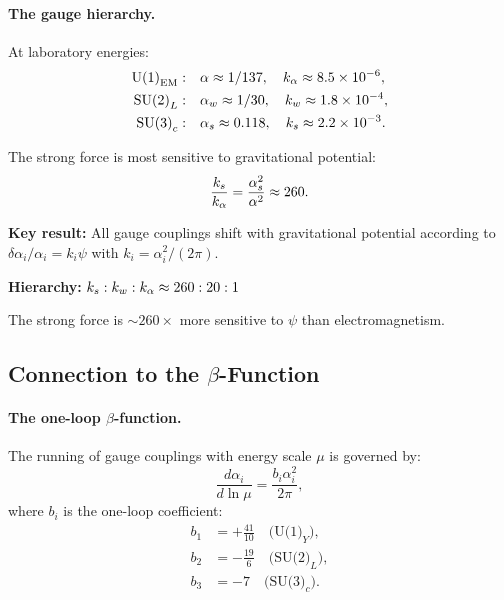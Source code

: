 \paragraph{The gauge hierarchy.}
At laboratory energies:
\begin{align}
\text{U(1)}_{\rm EM}:& \quad \alpha \approx 1/137, \quad k_\alpha \approx 8.5 \times 10^{-6}, \\
\text{SU(2)}_L:& \quad \alpha_w \approx 1/30, \quad k_w \approx 1.8 \times 10^{-4}, \\
\text{SU(3)}_c:& \quad \alpha_s \approx 0.118, \quad k_s \approx 2.2 \times 10^{-3}.
\end{align}

The strong force is most sensitive to gravitational potential:
\begin{equation}\label{eq:ks-kalpha-ratio}
\frac{k_s}{k_\alpha} = \frac{\alpha_s^2}{\alpha^2} \approx 260.
\end{equation}

\begin{tcolorbox}[colback=green!5!white, colframe=green!50!black, title=The Gauge Coupling Hierarchy]
\textbf{Key result:} All gauge couplings shift with gravitational potential according to $\delta\alpha_i/\alpha_i = k_i\psi$ with $k_i = \alpha_i^2/(2\pi)$.

\textbf{Hierarchy:} $k_s : k_w : k_\alpha \approx 260 : 20 : 1$

The strong force is $\sim 260\times$ more sensitive to $\psi$ than electromagnetism.
\end{tcolorbox}

\subsection{Connection to the $\beta$-Function}\label{sec:gauge-beta}

\paragraph{The one-loop $\beta$-function.}
The running of gauge couplings with energy scale $\mu$ is governed by:
\begin{equation}\label{eq:beta-standard}
\frac{d\alpha_i}{d\ln\mu} = \frac{b_i\alpha_i^2}{2\pi},
\end{equation}
where $b_i$ is the one-loop coefficient:
\begin{align}
b_1 &= +\frac{41}{10} \quad \text{(U(1)}_Y\text{)}, \\
b_2 &= -\frac{19}{6} \quad \text{(SU(2)}_L\text{)}, \\
b_3 &= -7 \quad \text{(SU(3)}_c\text{)}.
\end{align}

